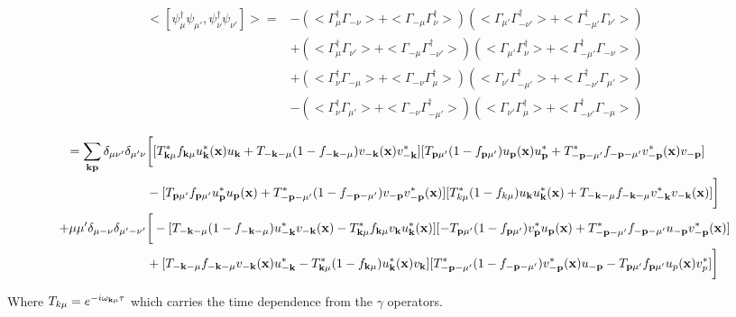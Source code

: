 \documentclass[prb,showpacs,amssymb,amsmath,twocolumn]{revtex4-1}
\begin{document}
\begin{widetext}
\begin{align*}
<[\psi^\dagger_{\mu} \psi_{\mu'},\psi^\dagger_{\nu} \psi_{\nu'}]>=&-(<\Gamma^\dagger_{\mu}\Gamma_{-\nu}>+<\Gamma_{-\mu}\Gamma^\dagger_{\nu}>)(<\Gamma_{\mu'}\Gamma^\dagger_{-\nu'}>+<\Gamma^\dagger_{-\mu'}\Gamma_{\nu'}>) \\ &+(<\Gamma^\dagger_{\mu}\Gamma_{\nu'}>+<\Gamma_{-\mu}\Gamma^\dagger_{-\nu'}>)(<\Gamma_{\mu'}\Gamma^\dagger_{\nu}>+<\Gamma^\dagger_{-\mu'}\Gamma_{-\nu}>) \\ 
&+(<\Gamma^\dagger_{\nu}\Gamma_{-\mu}>+<\Gamma_{-\nu}\Gamma^\dagger_{\mu}>)(<\Gamma_{\nu'}\Gamma^\dagger_{-\mu'}>+<\Gamma^\dagger_{-\nu'}\Gamma_{\mu'}>) \\
&-(<\Gamma^\dagger_{\nu}\Gamma_{\mu'}>+<\Gamma_{-\nu}\Gamma^\dagger_{-\mu'}>)(<\Gamma_{\nu'}\Gamma^\dagger_{\mu}>+<\Gamma^\dagger_{-\nu'}\Gamma_{-\mu}>)
\end{align*}

\begin{align*}
=\sum\limits_{{\bf k}{\bf p}}\delta_{\mu\nu'}\delta_{\mu'\nu}&\bigg[[T^*_{{\bf k}\mu}f_{{\bf k}\mu}u^*_{\bf k}({\bf x})u_{\bf k}+T_{-{\bf k}-\mu}(1-f_{-{\bf k}-\mu})v_{-{\bf k}}({\bf x})v^*_{-{\bf k}}][T_{{\bf p}\mu'}(1-f_{{\bf p}\mu'})u_{\bf p}({\bf x})u^*_{\bf p}+T^*_{-{\bf p}-\mu'}f_{-{\bf p}-\mu'}v^*_{-{\bf p}}({\bf x})v_{-{\bf p}}] \\ 
&-[T_{{\bf p}\mu'}f_{{\bf p}\mu'}u^*_{\bf p} u_{\bf p}({\bf x})+T^*_{-{\bf p}-\mu'}(1-f_{-{\bf p}-\mu'})v_{-{\bf p}}v^*_{-{\bf p}}({\bf x})] [T^*_{k\mu}(1-f_{k\mu})u_{\bf k} u^*_{\bf k}({\bf x})+T_{-{\bf k}-\mu}f_{-{\bf k}-\mu}v^*_{-{\bf k}}v_{-{\bf k}}({\bf x})]\bigg] 
\\ 
+\mu\mu'\delta_{\mu-\nu}\delta_{\mu'-\nu'}&\bigg[-[T_{-{\bf k}-\mu}(1-f_{-{\bf k}-\mu})u^*_{-{\bf k}}v_{-{\bf k}}({\bf x})-T^*_{{\bf k}\mu}f_{{\bf k}\mu}v_{\bf k} u^*_{\bf k} ({\bf x})][-T_{{\bf p}\mu'}(1-f_{{\bf p}\mu'})v^*_{\bf p} u_{\bf p}({\bf x})+T^*_{-{\bf p}-\mu'}f_{-{\bf p}-\mu'}u_{-{\bf p}}v^*_{-{\bf p}}({\bf x})] \\ 
&+ [T_{-{\bf k}-\mu}f_{-{\bf k}-\mu}v_{-{\bf k}}({\bf x})u^*_{-{\bf k}}-T^*_{{\bf k}\mu}(1-f_{{\bf k}\mu})u^*_{\bf k} ({\bf x})v_{\bf k}][T^*_{-{\bf p}-\mu'}(1-f_{-{\bf p}-\mu'})v^*_{-{\bf p}}({\bf x})u_{-{\bf p}}-T_{{\bf p}\mu'}f_{{\bf p}\mu'}u_p({\bf x})v^*_p]\bigg]
\end{align*}

Where $T_{k\mu}=e^{-i\omega_{{\bf k}\mu}\tau}$ which carries the time dependence from the $\gamma$ operators. 



\end{widetext}
\end{document}
